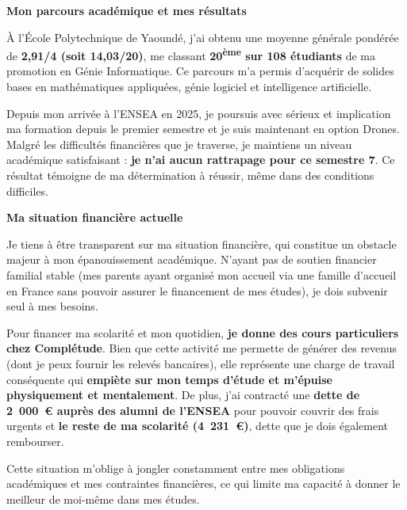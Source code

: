 \documentclass[a4paper,11pt]{article}
\begin{document}
\vspace{0.4cm}

\textbf{\color{primary}Mon parcours académique et mes résultats}

\vspace{0.2cm}

À l'École Polytechnique de Yaoundé, j'ai obtenu une moyenne générale pondérée de \textbf{2,91/4 (soit 14,03/20)}, me classant \textbf{20\textsuperscript{ème} sur 108 étudiants} de ma promotion en Génie Informatique. Ce parcours m'a permis d'acquérir de solides bases en mathématiques appliquées, génie logiciel et intelligence artificielle.

Depuis mon arrivée à l'ENSEA en 2025, je poursuis avec sérieux et implication ma formation depuis le premier semestre et je suis maintenant en option Drones. Malgré les difficultés financières que je traverse, je maintiens un niveau académique satisfaisant : \textbf{je n'ai aucun rattrapage pour ce semestre 7}. Ce résultat témoigne de ma détermination à réussir, même dans des conditions difficiles.

\vspace{0.4cm}

\textbf{\color{primary}Ma situation financière actuelle}

\vspace{0.2cm}

Je tiens à être transparent sur ma situation financière, qui constitue un obstacle majeur à mon épanouissement académique. N'ayant pas de soutien financier familial stable (mes parents ayant organisé mon accueil via une famille d'accueil en France sans pouvoir assurer le financement de mes études), je dois subvenir seul à mes besoins.

Pour financer ma scolarité et mon quotidien, \textbf{je donne des cours particuliers chez Complétude}. Bien que cette activité me permette de générer des revenus (dont je peux fournir les relevés bancaires), elle représente une charge de travail conséquente qui \textbf{empiète sur mon temps d'étude et m'épuise physiquement et mentalement}. De plus, j'ai contracté une \textbf{dette de 2~000~€ auprès des alumni de l'ENSEA} pour pouvoir couvrir des frais urgents et \textbf{le reste de ma scolarité (4~231~€)}, dette que je dois également rembourser.

Cette situation m'oblige à jongler constamment entre mes obligations académiques et mes contraintes financières, ce qui limite ma capacité à donner le meilleur de moi-même dans mes études.
\end{document}
